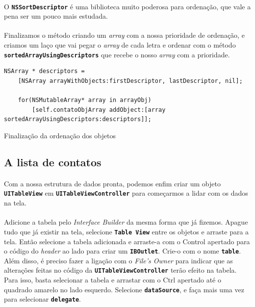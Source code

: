 \documentclass[a4paper,12pt,brazil,doubleside]{book}
\begin{document}
\begin{singlespace}
\paragraph{}O \texttt{\textbf{NSSortDescriptor}} é uma biblioteca muito poderosa para ordenação, que vale a pena ser um pouco mais estudada.
\paragraph{}Finalizamos o método criando um \emph{array} com a nossa prioridade de ordenação, e criamos um laço que vai pegar o \emph{array} de cada letra e ordenar com o método \texttt{\textbf{sortedArrayUsingDescriptors}} que recebe o nosso \emph{array} com a prioridade.

\begin{listing}[H]
\begin{verbatim}
NSArray * descriptors =
    [NSArray arrayWithObjects:firstDescriptor, lastDescriptor, nil];
      
    for(NSMutableArray* array in arrayObj)
        [self.contatoObjArray addObject:[array sortedArrayUsingDescriptors:descriptors]];
\end{verbatim}
\caption{Finalização da ordenação dos objetos}
\end{listing}

\subsection{A lista de contatos}

\paragraph{}Com a nossa estrutura de dados pronta, podemos enfim criar um objeto \texttt{\textbf{UITableView}} em \texttt{\textbf{UITableViewController}} para começarmos a lidar com os dados na tela.
\paragraph{}Adicione a tabela pelo \emph{Interface Builder} da mesma forma que já fizemos. Apague tudo que já existir na tela, selecione \texttt{\textbf{Table View}} entre os objetos e arraste para a tela. Então selecione a tabela adicionada e arraste-a com o Control apertado para o código do \emph{header} ao lado para criar um \texttt{\textbf{IBOutlet}}. Crie-o com o nome \texttt{\textbf{table}}. Além disso, é preciso fazer a ligação com o \emph{File's Owner} para indicar que as alterações feitas no código da \texttt{\textbf{UITableViewController}} terão efeito na tabela. Para isso, basta selecionar a tabela e arrastar com o Ctrl apertado até o quadrado amarelo no lado esquerdo. Selecione \texttt{\textbf{dataSource}}, e faça mais uma vez para selecionar \texttt{\textbf{delegate}}.


\end{singlespace}
\end{document}
